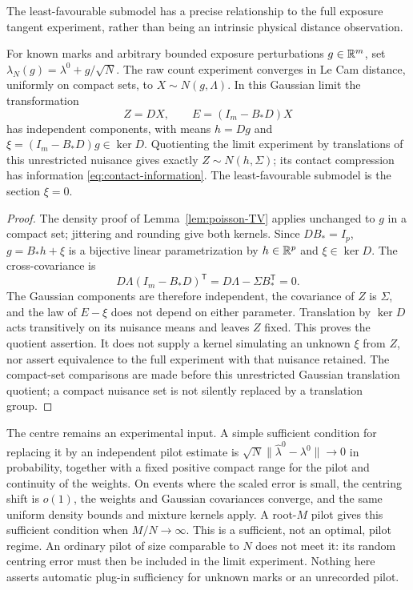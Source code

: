 The least-favourable submodel has a precise relationship to the full exposure tangent experiment, rather than being an intrinsic physical distance observation.
\begin{proposition}\label{prop:full-exposure}
For known marks and arbitrary bounded exposure perturbations $g\in\mathbb R^m$, set
$\lambda_N(g)=\lambda^0+g/\sqrt N$. The raw count experiment converges in Le Cam distance, uniformly on compact sets, to $X\sim N(g,\Lambda)$. In this Gaussian limit the transformation
\[
 Z=DX,\qquad E=(I_m-B_*D)X
\]
has independent components, with means
$h=Dg$ and $\xi=(I_m-B_*D)g\in\ker D$. Quotienting the limit experiment by translations of this unrestricted nuisance gives exactly $Z\sim N(h,\Sigma)$; its contact compression has information \eqref{eq:contact-information}. The least-favourable submodel is the section $\xi=0$.
\end{proposition}
\begin{proof}
The density proof of Lemma~\ref{lem:poisson-TV} applies unchanged to $g$ in a compact set; jittering and rounding give both kernels. Since $DB_*=I_p$, $g=B_*h+\xi$ is a bijective linear parametrization by $h\in\mathbb R^p$ and $\xi\in\ker D$. The cross-covariance is
\[
 D\Lambda(I_m-B_*D)^{\mathsf T}
       =D\Lambda-\Sigma B_*^{\mathsf T}=0.
\]
The Gaussian components are therefore independent, the covariance of $Z$ is $\Sigma$, and the law of $E-\xi$ does not depend on either parameter. Translation by $\ker D$ acts transitively on its nuisance means and leaves $Z$ fixed. This proves the quotient assertion. It does not supply a kernel simulating an unknown $\xi$ from $Z$, nor assert equivalence to the full experiment with that nuisance retained. The compact-set comparisons are made before this unrestricted Gaussian translation quotient; a compact nuisance set is not silently replaced by a translation group.
\end{proof}

The centre remains an experimental input. A simple sufficient condition for replacing it by an independent pilot estimate is
$\sqrt N\|\widehat\lambda^0-\lambda^0\|\to0$ in probability, together with a fixed positive compact range for the pilot and continuity of the weights. On events where the scaled error is small, the centring shift is $o(1)$, the weights and Gaussian covariances converge, and the same uniform density bounds and mixture kernels apply. A root-$M$ pilot gives this sufficient condition when $M/N\to\infty$. This is a sufficient, not an optimal, pilot regime. An ordinary pilot of size comparable to $N$ does not meet it: its random centring error must then be included in the limit experiment. Nothing here asserts automatic plug-in sufficiency for unknown marks or an unrecorded pilot.
